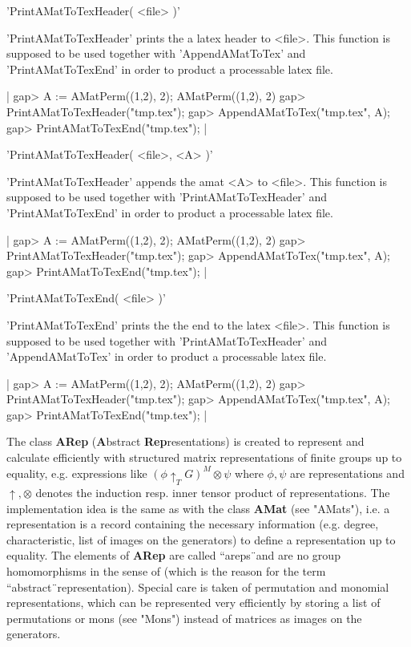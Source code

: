 
'PrintAMatToTexHeader( <file> )'

'PrintAMatToTexHeader' prints the a latex header to <file>.
This function is supposed to be used together with
'AppendAMatToTex' and 'PrintAMatToTexEnd' in order to 
product a processable latex file.

|    gap> A := AMatPerm((1,2), 2);
    AMatPerm((1,2), 2)
    gap> PrintAMatToTexHeader("tmp.tex");
    gap> AppendAMatToTex("tmp.tex", A);
    gap> PrintAMatToTexEnd("tmp.tex"); |


'PrintAMatToTexHeader( <file>, <A> )'

'PrintAMatToTexHeader' appends the amat <A> to <file>. This function
is supposed to be used together with 'PrintAMatToTexHeader'
and 'PrintAMatToTexEnd' in order to 
product a processable latex file.

|    gap> A := AMatPerm((1,2), 2);
    AMatPerm((1,2), 2)
    gap> PrintAMatToTexHeader("tmp.tex");
    gap> AppendAMatToTex("tmp.tex", A);
    gap> PrintAMatToTexEnd("tmp.tex"); |


'PrintAMatToTexEnd( <file> )'

'PrintAMatToTexEnd' prints the the end to the latex <file>.
This function is supposed to be used together with
'PrintAMatToTexHeader' and 'AppendAMatToTex' in order to 
product a processable latex file.

|    gap> A := AMatPerm((1,2), 2);
    AMatPerm((1,2), 2)
    gap> PrintAMatToTexHeader("tmp.tex");
    gap> AppendAMatToTex("tmp.tex", A);
    gap> PrintAMatToTexEnd("tmp.tex"); |


The class {\bf ARep} ({\bf A}bstract {\bf Rep}resentations) is 
created to represent and calculate efficiently with structured 
matrix representations of finite groups up to equality, e.g.  
expressions like 
$(\phi\uparrow_T G)^M\otimes\psi$ where $\phi, \psi$ are
representations and $\uparrow, \otimes$ denotes the induction 
resp. inner tensor product of representations. 
The implementation idea is the same as with the class 
{\bf AMat} (see "AMats"), i.e. a representation is a record 
containing the necessary information
(e.g. degree, characteristic, list of images on the generators)
to define a representation up to equality. 
The elements of {\bf ARep} are called ``areps\"\ 
and are no group homomorphisms in the sense of {\GAP} (which is 
the reason for the term ``abstract\"\ representation). 
Special care is taken of permutation and monomial representations,
which can be represented very efficiently by storing a list of 
permutations or mons (see "Mons") instead of matrices as 
images on the generators.

